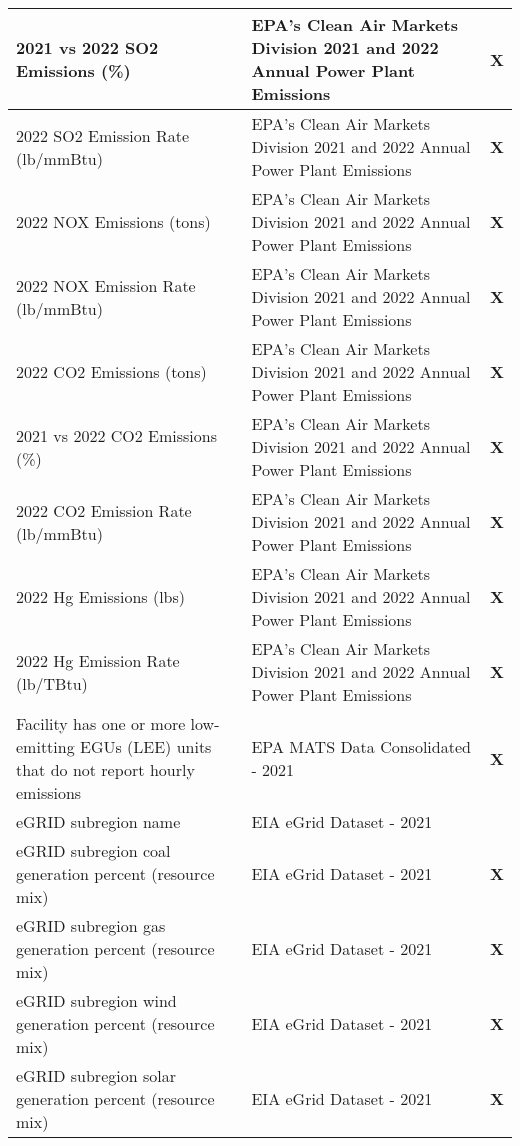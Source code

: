 \begin{table}[H]
\begin{adjustbox}{width=\textwidth}
\begin{tabular}{|l | l | l |}
        \midrule
        2021 vs 2022 SO2 Emissions (\%) & EPA's Clean Air Markets Division 2021 and 2022 Annual Power Plant Emissions & \textbf{X} \\
        \midrule
        2022 SO2 Emission Rate (lb/mmBtu) & EPA's Clean Air Markets Division 2021 and 2022 Annual Power Plant Emissions & \textbf{X} \\
        \midrule
        2022 NOX Emissions (tons) & EPA's Clean Air Markets Division 2021 and 2022 Annual Power Plant Emissions & \textbf{X} \\
        \midrule
        2022 NOX Emission Rate (lb/mmBtu) & EPA's Clean Air Markets Division 2021 and 2022 Annual Power Plant Emissions & \textbf{X} \\
        \midrule
        2022 CO2 Emissions (tons) & EPA's Clean Air Markets Division 2021 and 2022 Annual Power Plant Emissions & \textbf{X} \\
        \midrule
        2021 vs 2022 CO2 Emissions (\%) & EPA's Clean Air Markets Division 2021 and 2022 Annual Power Plant Emissions & \textbf{X} \\
        \midrule
        2022 CO2 Emission Rate (lb/mmBtu) & EPA's Clean Air Markets Division 2021 and 2022 Annual Power Plant Emissions & \textbf{X} \\
        \midrule
        2022 Hg Emissions (lbs) & EPA's Clean Air Markets Division 2021 and 2022 Annual Power Plant Emissions & \textbf{X} \\
        \midrule
        2022 Hg Emission Rate (lb/TBtu) & EPA's Clean Air Markets Division 2021 and 2022 Annual Power Plant Emissions & \textbf{X} \\
        \midrule
        Facility has one or more low-emitting EGUs (LEE) units that do not report hourly emissions & EPA MATS Data Consolidated - 2021 & \textbf{X} \\
        \midrule
        eGRID subregion name & EIA eGrid Dataset - 2021 & \\
        \midrule
        eGRID subregion coal generation percent (resource mix) & EIA eGrid Dataset - 2021 & \textbf{X} \\
        \midrule
        eGRID subregion gas generation percent (resource mix) & EIA eGrid Dataset - 2021 & \textbf{X} \\
        \midrule
        eGRID subregion wind generation percent (resource mix) & EIA eGrid Dataset - 2021 & \textbf{X} \\
        \midrule
        eGRID subregion solar generation percent (resource mix) & EIA eGrid Dataset - 2021 & \textbf{X} \\

\end{tabular}
\end{adjustbox}
\end{table}
